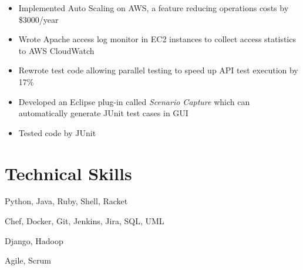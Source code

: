 \documentclass{resume}
\begin{document}
\begin{itemize}
\item Implemented Auto Scaling on AWS, a feature reducing operations costs by \$3000/year
\item Wrote Apache access log monitor in EC2 instances to collect access statistics to AWS CloudWatch
\item Rewrote test code allowing parallel testing to speed up API test execution by 17\%
\end{itemize}

\begin{itemize}
\item Developed an Eclipse plug-in called \textit{Scenario Capture} which can automatically generate JUnit test cases in GUI
\item Tested code by JUnit
\end{itemize}

%
%

\section{Technical Skills}
\begin{description}[style=nextline,leftmargin=8em,topsep=1pt,parsep=0.5ex]
  \item[Languages] Python, Java, Ruby, Shell, Racket
  \item[Tools] Chef, Docker, Git, Jenkins, Jira, SQL, UML
  \item[Frameworks] Django, Hadoop
  \item[Methodologies] Agile, Scrum
\end{description}

%
%

%
%




\end{document}

